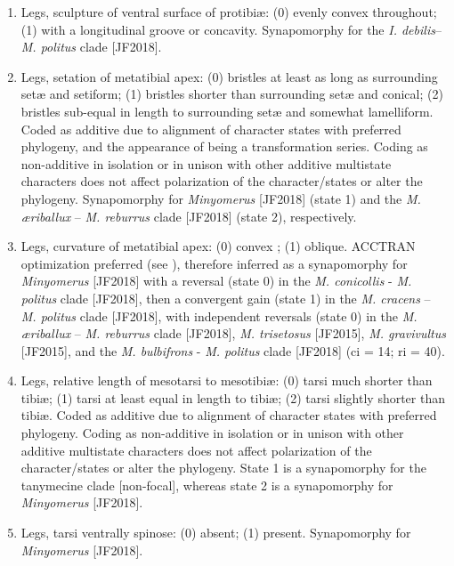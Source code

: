 \documentclass[fleqn,10pt,lineno]{wlpeerj} %
\begin{document}
\begin{enumerate}
	 	\item Legs, sculpture of ventral surface of protibi{\ae}: (0) evenly convex throughout; (1) with a longitudinal groove or concavity. Synapomorphy for the \textit{I. debilis}–\textit{M. politus} clade [JF2018].
	 	
	 	\item Legs, setation of metatibial apex: (0) bristles at least as long as surrounding set{\ae} and setiform; (1) bristles shorter than surrounding set{\ae} and conical; (2) bristles sub-equal in length to surrounding set{\ae} and somewhat lamelliform. Coded as additive due to alignment of character states with preferred phylogeny, and the appearance of being a transformation series. Coding as non-additive in isolation or in unison with other additive multistate characters does not affect polarization of the character/states or alter the phylogeny. Synapomorphy for \textit{Minyomerus} [JF2018] (state 1) and the \textit{M. {\ae}riballux} – \textit{M. reburrus} clade [JF2018] (state 2), respectively.
	 	
	 	\item Legs, curvature of metatibial apex: (0) convex ; (1) oblique. ACCTRAN optimization preferred (see \citealt{agnarsson2008}), therefore inferred as a synapomorphy for \textit{Minyomerus} [JF2018] with a reversal (state 0) in the \textit{M. conicollis} - \textit{M. politus} clade [JF2018], then a convergent gain (state 1) in the \textit{M. cracens} – \textit{M. politus} clade [JF2018], with independent reversals (state 0) in the \textit{M. {\ae}riballux} – \textit{M. reburrus} clade [JF2018], \textit{M. trisetosus} [JF2015], \textit{M. gravivultus} [JF2015], and the \textit{M. bulbifrons} - \textit{M. politus} clade [JF2018] (ci = 14; ri = 40).
	 	
		\item Legs, relative length of mesotarsi to mesotibi{\ae}: (0) tarsi much shorter than tibi{\ae}; (1) tarsi at least equal in length to tibi{\ae}; (2) tarsi slightly shorter than tibi{\ae}. Coded as additive due to alignment of character states with preferred phylogeny. Coding as non-additive in isolation or in unison with other additive multistate characters does not affect polarization of the character/states or alter the phylogeny. State 1 is a synapomorphy for the tanymecine clade [non-focal], whereas state 2 is a synapomorphy for \textit{Minyomerus} [JF2018].
		
		\item Legs, tarsi ventrally spinose: (0) absent; (1) present. Synapomorphy for \textit{Minyomerus} [JF2018].
		

\end{enumerate}
\end{document}
